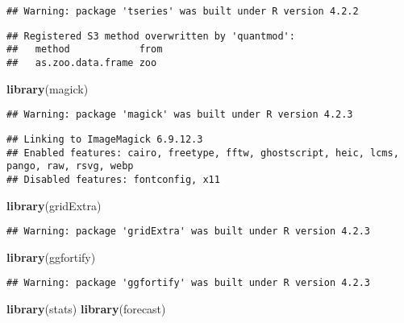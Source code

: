 \documentclass[
]{article}
\newenvironment{Shaded}{\begin{snugshade}}{\end{snugshade}}
\newcommand{\FunctionTok}[1]{\textcolor[rgb]{0.13,0.29,0.53}{\textbf{#1}}}
\newcommand{\NormalTok}[1]{#1}
\begin{document}
\begin{verbatim}
## Warning: package 'tseries' was built under R version 4.2.2
\end{verbatim}

\begin{verbatim}
## Registered S3 method overwritten by 'quantmod':
##   method            from
##   as.zoo.data.frame zoo
\end{verbatim}

\begin{Shaded}
\begin{Highlighting}[]
\FunctionTok{library}\NormalTok{(magick)}
\end{Highlighting}
\end{Shaded}

\begin{verbatim}
## Warning: package 'magick' was built under R version 4.2.3
\end{verbatim}

\begin{verbatim}
## Linking to ImageMagick 6.9.12.3
## Enabled features: cairo, freetype, fftw, ghostscript, heic, lcms, pango, raw, rsvg, webp
## Disabled features: fontconfig, x11
\end{verbatim}

\begin{Shaded}
\begin{Highlighting}[]
\FunctionTok{library}\NormalTok{(gridExtra)}
\end{Highlighting}
\end{Shaded}

\begin{verbatim}
## Warning: package 'gridExtra' was built under R version 4.2.3
\end{verbatim}

\begin{Shaded}
\begin{Highlighting}[]
\FunctionTok{library}\NormalTok{(ggfortify)}
\end{Highlighting}
\end{Shaded}

\begin{verbatim}
## Warning: package 'ggfortify' was built under R version 4.2.3
\end{verbatim}

\begin{Shaded}
\begin{Highlighting}[]
\FunctionTok{library}\NormalTok{(stats)}
\FunctionTok{library}\NormalTok{(forecast)}
\end{Highlighting}
\end{Shaded}
\end{document}
